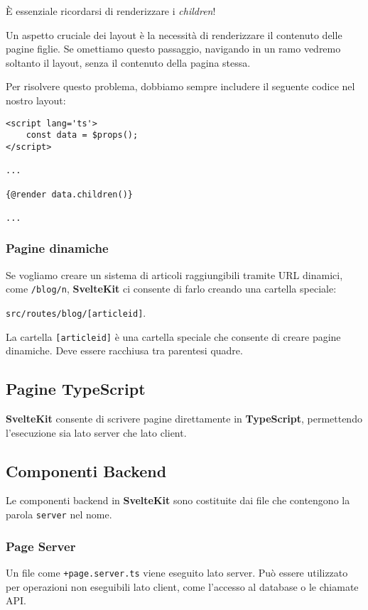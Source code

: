 \documentclass[12pt]{article}
\begin{document}
\begin{highlight}
    È essenziale ricordarsi di renderizzare i \textit{children}!
\end{highlight}

Un aspetto cruciale dei layout è la necessità di renderizzare
il contenuto delle pagine figlie. Se omettiamo questo passaggio,
navigando in un ramo vedremo soltanto il layout, senza
il contenuto della pagina stessa.

Per risolvere questo problema, dobbiamo sempre includere il
seguente codice nel nostro layout:

\begin{verbatim}
<script lang='ts'>
    const data = $props();
</script>

...

{@render data.children()}

... 
\end{verbatim}

\subsubsection{Pagine dinamiche}
Se vogliamo creare un sistema di articoli raggiungibili
tramite URL dinamici, come \texttt{/blog/n}, \textbf{SvelteKit}
ci consente di farlo creando una cartella speciale:

\texttt{src/routes/blog/[articleid]}.

\begin{highlight}
    La cartella \texttt{[articleid]} è una cartella speciale
    che consente di creare pagine dinamiche. Deve essere
    racchiusa tra parentesi quadre.
\end{highlight}

\subsection{Pagine TypeScript}
\textbf{SvelteKit} consente di scrivere pagine direttamente in
\textbf{TypeScript}, permettendo l'esecuzione sia lato server
che lato client.

\subsection{Componenti Backend}
Le componenti backend in \textbf{SvelteKit} sono costituite
dai file che contengono la parola \texttt{server} nel nome.

\subsubsection{Page Server}
Un file come \texttt{+page.server.ts} viene eseguito lato server.
Può essere utilizzato per operazioni non eseguibili lato client,
come l'accesso al database o le chiamate API.
\end{document}

